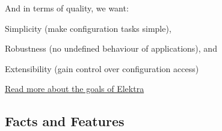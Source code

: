 And in terms of quality, we want\+:


\begin{DoxyEnumerate}
\item Simplicity (make configuration tasks simple),
\item Robustness (no undefined behaviour of applications), and
\item Extensibility (gain control over configuration access)
\end{DoxyEnumerate}

\hyperlink{doc_GOALS_md}{Read more about the goals of Elektra}

\subsection*{Facts and Features}


